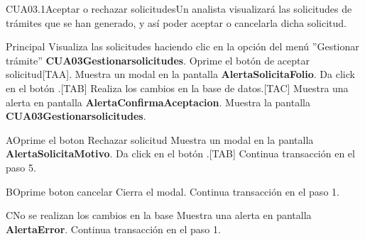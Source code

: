 \begin{UseCase}{CUA03.1}{Aceptar o rechazar solicitudes}{Un analista 
visualizará las solicitudes de trámites que se han generado, y así poder 
aceptar o cancelarla dicha solicitud.}
\end{UseCase}

\begin{UCtrayectoria}{Principal}
  \UCpaso[\UCactor] Visualiza las solicitudes haciendo clic en la opción del menú ''Gestionar trámite'' {\bf CUA03Gestionarsolicitudes}.
  \UCpaso [\UCactor] Oprime el botón de aceptar solicitud[TAA].
	\UCpaso Muestra un modal en la pantalla {\bf AlertaSolicitaFolio}.
  \UCpaso [\UCactor] Da click en el botón .[TAB]
	\UCpaso Realiza los cambios en la base de datos.[TAC]
	\UCpaso Muestra una alerta en pantalla {\bf AlertaConfirmaAceptacion}.
	\UCpaso Muestra la pantalla {\bf CUA03Gestionarsolicitudes}.
\end{UCtrayectoria}

\begin{UCtrayectoriaA}{A}{Oprime el boton Rechazar solicitud} 
	\UCpaso Muestra un modal en la pantalla {\bf AlertaSolicitaMotivo}.
  \UCpaso [\UCactor] Da click en el botón .[TAB]
	\UCpaso Continua transacción en el paso 5.
\end{UCtrayectoriaA}

\begin{UCtrayectoriaA}{B}{Oprime boton cancelar} 
  \UCpaso Cierra el modal.
  \UCpaso Continua transacción en el paso 1.
\end{UCtrayectoriaA}

\begin{UCtrayectoriaA}{C}{No se realizan los cambios en la base} 
  \UCpaso  Muestra una alerta en pantalla {\bf AlertaError}.
  \UCpaso Continua transacción en el paso 1.
\end{UCtrayectoriaA}


